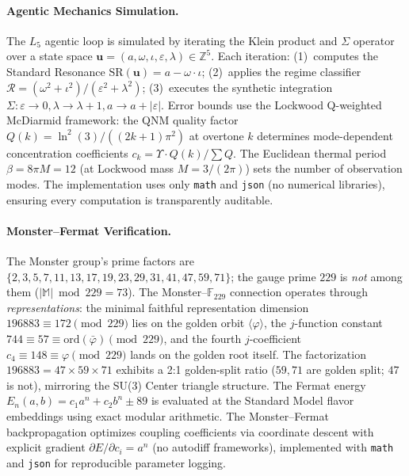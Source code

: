 \paragraph{Agentic Mechanics Simulation.}
The $L_5$ agentic loop is simulated by iterating the Klein product and $\Sigma$ operator over a state space $\mathbf{u} = (a, \omega, \iota, \varepsilon, \lambda) \in \mathbb{Z}^5$. Each iteration: (1)~computes the Standard Resonance $\mathrm{SR}(\mathbf{u}) = a - \omega \cdot \iota$; (2)~applies the regime classifier $\mathcal{R} = (\omega^2 + \iota^2)/(\varepsilon^2 + \lambda^2)$; (3)~executes the synthetic integration $\Sigma: \varepsilon \to 0, \lambda \to \lambda + 1, a \to a + |\varepsilon|$. Error bounds use the Lockwood Q-weighted McDiarmid framework: the QNM quality factor $Q(k) = \ln^2(3) / ((2k+1)\pi^2)$ at overtone $k$ determines mode-dependent concentration coefficients $c_k = \Upsilon \cdot Q(k) / \sum Q$. The Euclidean thermal period $\beta = 8\pi M = 12$ (at Lockwood mass $M = 3/(2\pi)$) sets the number of observation modes. The implementation uses only \texttt{math} and \texttt{json} (no numerical libraries), ensuring every computation is transparently auditable.

\paragraph{Monster--Fermat Verification.}
The Monster group's prime factors are $\{2, 3, 5, 7, 11, 13, 17, 19, 23, 29, 31, 41, 47, 59, 71\}$; the gauge prime $229$ is \emph{not} among them ($|\mathbb{M}| \bmod 229 = 73$). The Monster--$\mathbb{F}_{229}$ connection operates through \emph{representations}: the minimal faithful representation dimension $196883 \equiv 172 \pmod{229}$ lies on the golden orbit $\langle\varphi\rangle$, the $j$-function constant $744 \equiv 57 \equiv \mathrm{ord}(\bar\varphi) \pmod{229}$, and the fourth $j$-coefficient $c_4 \equiv 148 \equiv \varphi \pmod{229}$ lands on the golden root itself. The factorization $196883 = 47 \times 59 \times 71$ exhibits a 2:1 golden-split ratio ($59, 71$ are golden split; $47$ is not), mirroring the SU(3) Center triangle structure. The Fermat energy $E_n(a,b) = c_1 a^n + c_2 b^n \pm 89$ is evaluated at the Standard Model flavor embeddings using exact modular arithmetic. The Monster--Fermat backpropagation optimizes coupling coefficients via coordinate descent with explicit gradient $\partial E / \partial c_i = a^n$ (no autodiff frameworks), implemented with \texttt{math} and \texttt{json} for reproducible parameter logging.

